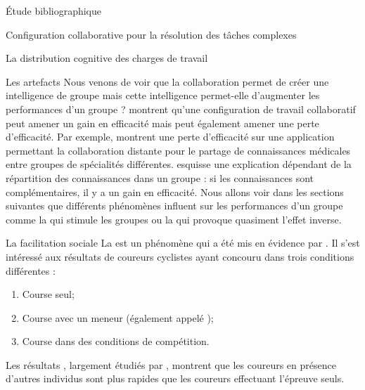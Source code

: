 \documentclass[myfrancais,ngerman,english,french]{mythesis}
\begin{document}
\begin{mychapter}{Étude bibliographique}
\begin{mysection}{Configuration collaborative pour la résolution des tâches complexes}
\begin{mysubsection}{La distribution cognitive des charges de travail}
\begin{mysubsubsection}{Les artefacts}
					Nous venons de voir que la collaboration permet de créer une intelligence de groupe mais cette intelligence permet-elle d'augmenter les performances d'un groupe ?
					 montrent qu'une configuration de travail collaboratif peut amener un gain en efficacité mais peut également amener une perte d'efficacité.
					Par exemple,  montrent une perte d'efficacité sur une application permettant la collaboration distante pour le partage de connaissances médicales entre groupes de spécialités différentes.
					 esquisse une explication dépendant de la répartition des connaissances dans un groupe : si les connaissances sont complémentaires, il y a un gain en efficacité.
					Nous allons voir dans les sections suivantes que différents phénomènes influent sur les performances d'un groupe comme la  qui stimule les groupes ou la  qui provoque quasiment l'effet inverse.
				\end{mysubsubsection}
			\end{mysubsection}
			\begin{mysubsection}{La facilitation sociale}
				La  est un phénomène qui a été mis en évidence par .
				Il s'est intéressé aux résultats de coureurs cyclistes ayant concouru dans trois conditions différentes :
				\begin{enumerate}
					\item Course seul;
					\item Course avec un meneur (également appelé );
					\item Course dans des conditions de compétition.
				\end{enumerate}
				Les résultats , largement étudiés par , montrent que les coureurs en présence d'autres individus sont plus rapides que les coureurs effectuant l'épreuve seuls.


\end{mysubsection}
\end{mysection}
\end{mychapter}
\end{document}
